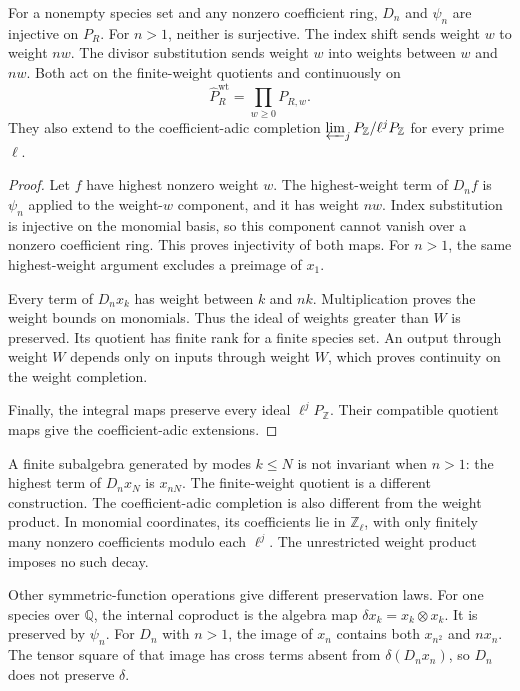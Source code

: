 \begin{proposition}
\label{v4-arith:hecke:prop:weights}
For a nonempty species set and any nonzero coefficient ring,
$D_n$ and $\psi_n$ are injective on $P_R$.
For $n>1$, neither is surjective.
The index shift sends weight $w$ to weight $nw$.
The divisor substitution sends weight $w$ into weights between $w$ and $nw$.
Both act on the finite-weight quotients and continuously on
\[
 \widehat P_R^{\mathrm{wt}}=\prod_{w\geq0}P_{R,w}.
\]
They also extend to the coefficient-adic completion
$\varprojlim_jP_{\mathbb Z}/\ell^jP_{\mathbb Z}$ for every prime $\ell$.
\end{proposition}
\begin{proof}
Let $f$ have highest nonzero weight $w$.
The highest-weight term of $D_nf$ is $\psi_n$ applied to the
weight-$w$ component, and it has weight $nw$.
Index substitution is injective on the monomial basis, so this
component cannot vanish over a nonzero coefficient ring.
This proves injectivity of both maps.
For $n>1$, the same highest-weight argument excludes a preimage of $x_1$.

Every term of $D_nx_k$ has weight between $k$ and $nk$.
Multiplication proves the weight bounds on monomials.
Thus the ideal of weights greater than $W$ is preserved.
Its quotient has finite rank for a finite species set.
An output through weight $W$ depends only on inputs through weight $W$,
which proves continuity on the weight completion.

Finally, the integral maps preserve every ideal $\ell^jP_{\mathbb Z}$.
Their compatible quotient maps give the coefficient-adic extensions.
\end{proof}

A finite subalgebra generated by modes $k\leq N$ is not invariant
when $n>1$: the highest term of $D_nx_N$ is $x_{nN}$.
The finite-weight quotient is a different construction.
The coefficient-adic completion is also different from the weight product.
In monomial coordinates, its coefficients lie in $\mathbb Z_\ell$,
with only finitely many nonzero coefficients modulo each $\ell^j$.
The unrestricted weight product imposes no such decay.

Other symmetric-function operations give different preservation laws.
For one species over $\mathbb Q$, the internal coproduct is the
algebra map $\delta x_k=x_k\otimes x_k$.
It is preserved by $\psi_n$.
For $D_n$ with $n>1$, the image of $x_n$ contains both
$x_{n^2}$ and $nx_n$.
The tensor square of that image has cross terms absent from
$\delta(D_nx_n)$, so $D_n$ does not preserve $\delta$.

